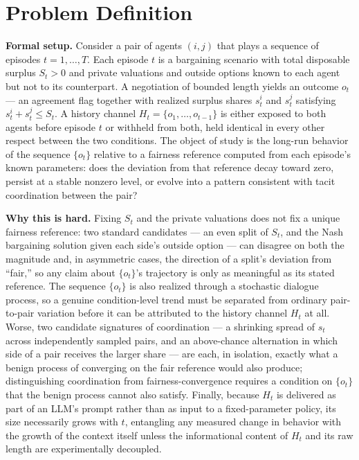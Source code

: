 \documentclass[11pt]{article}
\begin{document}
\section{Problem Definition}

\noindent\textbf{Formal setup.} Consider a pair of agents $(i,j)$ that plays a sequence of episodes $t = 1,\dots,T$. Each episode $t$ is a bargaining scenario with total disposable surplus $S_t > 0$ and private valuations and outside options known to each agent but not to its counterpart. A negotiation of bounded length yields an outcome $o_t$ --- an agreement flag together with realized surplus shares $s_t^i$ and $s_t^j$ satisfying $s_t^i + s_t^j \leq S_t$. A history channel $H_t = \{o_1,\dots,o_{t-1}\}$ is either exposed to both agents before episode $t$ or withheld from both, held identical in every other respect between the two conditions. The object of study is the long-run behavior of the sequence $\{o_t\}$ relative to a fairness reference computed from each episode's known parameters: does the deviation from that reference decay toward zero, persist at a stable nonzero level, or evolve into a pattern consistent with tacit coordination between the pair?

\noindent\textbf{Why this is hard.} Fixing $S_t$ and the private valuations does not fix a unique fairness reference: two standard candidates --- an even split of $S_t$, and the Nash bargaining solution given each side's outside option --- can disagree on both the magnitude and, in asymmetric cases, the direction of a split's deviation from ``fair,'' so any claim about $\{o_t\}$'s trajectory is only as meaningful as its stated reference. The sequence $\{o_t\}$ is also realized through a stochastic dialogue process, so a genuine condition-level trend must be separated from ordinary pair-to-pair variation before it can be attributed to the history channel $H_t$ at all. Worse, two candidate signatures of coordination --- a shrinking spread of $s_t$ across independently sampled pairs, and an above-chance alternation in which side of a pair receives the larger share --- are each, in isolation, exactly what a benign process of converging on the fair reference would also produce; distinguishing coordination from fairness-convergence requires a condition on $\{o_t\}$ that the benign process cannot also satisfy. Finally, because $H_t$ is delivered as part of an LLM's prompt rather than as input to a fixed-parameter policy, its size necessarily grows with $t$, entangling any measured change in behavior with the growth of the context itself unless the informational content of $H_t$ and its raw length are experimentally decoupled.
\end{document}
